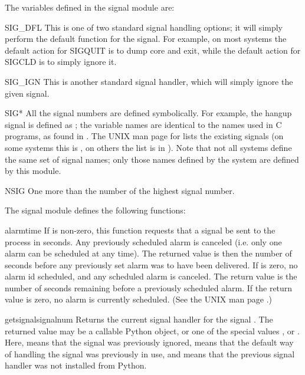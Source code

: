 The variables defined in the signal module are:

\renewcommand{\indexsubitem}{(in module signal)}
\begin{datadesc}{SIG_DFL}
  This is one of two standard signal handling options; it will simply
  perform the default function for the signal.  For example, on most
  systems the default action for SIGQUIT is to dump core and exit,
  while the default action for SIGCLD is to simply ignore it.
\end{datadesc}

\begin{datadesc}{SIG_IGN}
  This is another standard signal handler, which will simply ignore
  the given signal.
\end{datadesc}

\begin{datadesc}{SIG*}
  All the signal numbers are defined symbolically.  For example, the
  hangup signal is defined as ; the variable names
  are identical to the names used in C programs, as found in
  .
  The UNIX man page for  lists the existing signals (on
  some systems this is , on others the list is in
  ).
  Note that not all systems define the same set of signal names; only
  those names defined by the system are defined by this module.
\end{datadesc}

\begin{datadesc}{NSIG}
  One more than the number of the highest signal number.
\end{datadesc}

The signal module defines the following functions:

\begin{funcdesc}{alarm}{time}
  If  is non-zero, this function requests that a
   signal be sent to the process in  seconds.
  Any previously scheduled alarm is canceled (i.e. only one alarm can
  be scheduled at any time).  The returned value is then the number of
  seconds before any previously set alarm was to have been delivered.
  If  is zero, no alarm id scheduled, and any scheduled
  alarm is canceled.  The return value is the number of seconds
  remaining before a previously scheduled alarm.  If the return value
  is zero, no alarm is currently scheduled.  (See the UNIX man page
  .)
\end{funcdesc}

\begin{funcdesc}{getsignal}{signalnum}
  Returns the current signal handler for the signal .
  The returned value may be a callable Python object, or one of the
  special values ,  or
  .  Here,  means that the signal was
  previously ignored,  means that the default way
  of handling the signal was previously in use, and  means
  that the previous signal handler was not installed from Python.
\end{funcdesc}

